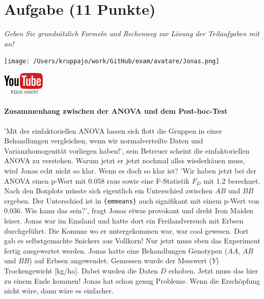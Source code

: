\documentclass[a4paper, 9pt]{scrartcl}\usepackage[]{graphicx}\usepackage[]{xcolor}
\begin{document}
 
\clearpage

\section{Aufgabe \hfill (11 Punkte)}

\textit{Geben Sie grundsätzlich Formeln und Rechenweg zur Lösung der Teilaufgaben mit an!} \\[1Ex]
 

 
\begin{minipage}[t]{0.5\textwidth}
\texttt{[image: /Users/kruppajo/work/GitHub/exam/avatare/Jonas.png]}
\end{minipage}
\begin{minipage}[t]{0.5\textwidth}
\hfill
\href{https://youtu.be/M9Uhm67ndxM}{\includegraphics[width = 2cm]{img/youtube}}
\end{minipage}
\vspace{-3Ex}



\paragraph{Zusammenhang zwischen der ANOVA und dem Post-hoc-Test}

'Mit der einfaktoriellen ANOVA lassen sich flott die Gruppen in einer Behandlungen vergleichen, wenn wir normalverteilte Daten und Varianzhomogenität vorliegen haben!', sein Betreuer scheint die einfaktoriellen ANOVA zu verstehen. Warum jetzt er jetzt nochmal alles wiederkäuen muss, wird Jonas echt nicht so klar. Wenn es doch so klar ist? 'Wir haben jetzt bei der ANOVA einen p-Wert mit 0.058 raus sowie eine F-Statistik $F_D$ mit 1.2 berechnet. Nach den Boxplots müsste sich eigentlich ein Unterschied zwischen $AB$ und $BB$ ergeben. Der Unterschied ist in \texttt{\{emmeans\}} auch signifikant mit einem p-Wert von 0.036. Wie kann das sein?', fragt Jonas etwas provokant und dreht Iron Maiden leiser. Jonas war im Emsland und hatte dort ein Freilandversuch mit Erbsen durchgeführt. Die Komune wo er untergekommen war, war cool gewesen. Dort gab es selbstgemachte Snickers aus Vollkorn! Nur jetzt muss eben das Experiment fertig ausgewertet werden. Jonas hatte eine Behandlungen Genotypen ($AA$, $AB$ und $BB$) auf Erbsen angewendet. Gemessen wurde der Messwert ($Y$) Trockengewicht [kg/ha]. Dabei wurden die Daten $D$ erhoben. Jetzt muss das hier zu einem Ende kommen! Jonas hat schon genug Probleme. Wenn die Erschöpfung nicht wäre, dann wäre es einfacher.
\end{document}

